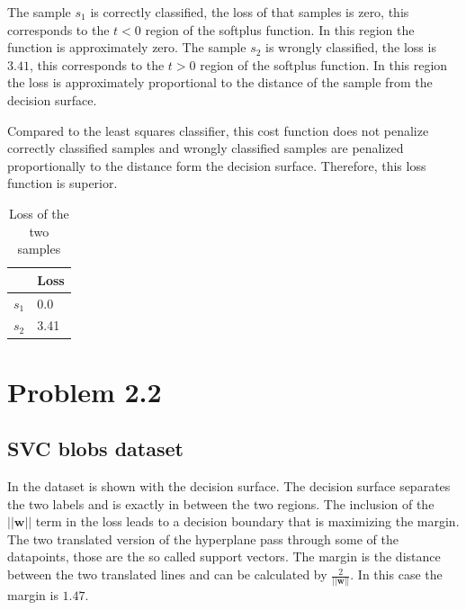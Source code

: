 \documentclass[12pt,a4paper]{scrartcl}
\newcommand{\matr}[1]{\mathbf{#1}}
\begin{document}
	The sample $s_1$ is correctly classified, the loss of that samples is zero, this corresponds to the $t<0$ region of the softplus function. In this region the function is approximately zero.
	The sample $s_2$ is wrongly classified, the loss is $3.41$, this corresponds to the $t>0$ region of the softplus function. In this region the loss is approximately proportional to the distance of the sample from the decision surface.
	
	Compared to the least squares classifier, this cost function does not penalize correctly classified samples and wrongly classified samples are penalized proportionally to the distance form the decision surface. Therefore, this loss function is superior.
	
	\begin{table}[H]
		\centering
		\begin{tabular}{|l|l|}
			\hline
			& Loss \\ \hline
			$s_1$ & 0.0  \\ \hline
			$s_2$ & 3.41 \\ \hline
		\end{tabular}
		\caption{Loss of the two samples}
		\label{tab:ex2_1_losses}
	\end{table}
	
	\section*{Problem 2.2}
	
	\subsection*{SVC blobs dataset}
	
	In  the dataset is shown with the decision surface. The decision surface separates the two labels and is exactly in between the two regions. The inclusion of the $||\matr{w}||$ term in the loss leads to a decision boundary that is maximizing the margin.
	The two translated version of the hyperplane pass through some of the datapoints, those are the so called support vectors.	The margin is the distance between the two translated lines and can be calculated by $\frac{2}{||\matr{w}||}$. In this case the margin is $1.47$.
		
\end{document}
